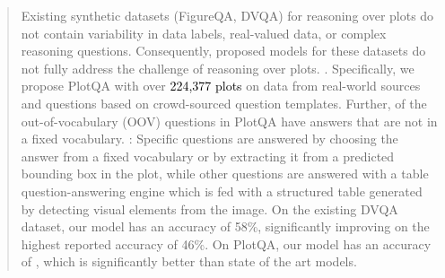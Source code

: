 \documentclass[10pt,twocolumn,letterpaper]{article}
\begin{document}
\begin{abstract}
Existing synthetic datasets (FigureQA, DVQA) for reasoning over plots do not contain variability in data labels, real-valued data, or complex reasoning questions. 
Consequently, proposed models for these datasets do not fully address the challenge of reasoning over plots. . %
Specifically, we propose PlotQA with  over \textcolor{black}{224,377 plots} on data from real-world sources and questions based on crowd-sourced question templates. 
Further,  of the out-of-vocabulary (OOV) questions in PlotQA have answers that are not in a fixed vocabulary.
: Specific questions are answered by choosing the answer from a fixed vocabulary or by extracting it from a predicted bounding box in the plot, while other questions are answered with a table question-answering engine which is fed with a structured table generated by detecting visual elements from the image. 
On the existing DVQA dataset, our model has an accuracy of 58\%, significantly improving on the highest reported accuracy of 46\%. 
On PlotQA, our model has an accuracy of , which is significantly better than state of the art models. 
\end{abstract}
\end{document}
